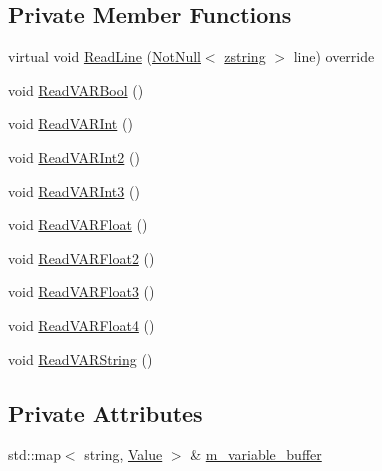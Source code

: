 \subsection*{Private Member Functions}
\begin{DoxyCompactItemize}
\item 
virtual void \mbox{\hyperlink{classmage_1_1loader_1_1_v_a_r_reader_a511a0778cc515aece781bfdb76024cea}{Read\+Line}} (\mbox{\hyperlink{namespacemage_a8769f9d670d6b585ea306cb1062af94b}{Not\+Null}}$<$ \mbox{\hyperlink{namespacemage_a4163ec9a9a27d5e7f4b452dcb99cb2b9}{zstring}} $>$ line) override
\item 
void \mbox{\hyperlink{classmage_1_1loader_1_1_v_a_r_reader_a2191e47d0806d408145422eb46e32ba1}{Read\+V\+A\+R\+Bool}} ()
\item 
void \mbox{\hyperlink{classmage_1_1loader_1_1_v_a_r_reader_a88a819066140cacd8ce494fca125e1e2}{Read\+V\+A\+R\+Int}} ()
\item 
void \mbox{\hyperlink{classmage_1_1loader_1_1_v_a_r_reader_a4e84ca5a6fabcf2ea29fbf32a5bdf1c4}{Read\+V\+A\+R\+Int2}} ()
\item 
void \mbox{\hyperlink{classmage_1_1loader_1_1_v_a_r_reader_a519dd541a8ee90bc83505d80e5dc1f49}{Read\+V\+A\+R\+Int3}} ()
\item 
void \mbox{\hyperlink{classmage_1_1loader_1_1_v_a_r_reader_a11f2ecdf718d1665a79406e7bebbc6f1}{Read\+V\+A\+R\+Float}} ()
\item 
void \mbox{\hyperlink{classmage_1_1loader_1_1_v_a_r_reader_ac80f8a30ffc67fc6f048cf32dd43c2e8}{Read\+V\+A\+R\+Float2}} ()
\item 
void \mbox{\hyperlink{classmage_1_1loader_1_1_v_a_r_reader_a133ffd4462be737377c0cdb921a90e75}{Read\+V\+A\+R\+Float3}} ()
\item 
void \mbox{\hyperlink{classmage_1_1loader_1_1_v_a_r_reader_a70dfe7e7e0b2fb9a79b6ff4342cc58dc}{Read\+V\+A\+R\+Float4}} ()
\item 
void \mbox{\hyperlink{classmage_1_1loader_1_1_v_a_r_reader_a4ccc6a48ca72707853ff910362318940}{Read\+V\+A\+R\+String}} ()
\end{DoxyCompactItemize}
\subsection*{Private Attributes}
\begin{DoxyCompactItemize}
\item 
std\+::map$<$ string, \mbox{\hyperlink{namespacemage_aa1fe0628487e0706e44efdc62dbdb3a2}{Value}} $>$ \& \mbox{\hyperlink{classmage_1_1loader_1_1_v_a_r_reader_a71291d47ea9f9d679bfd7584447ae6bb}{m\+\_\+variable\+\_\+buffer}}
\end{DoxyCompactItemize}


